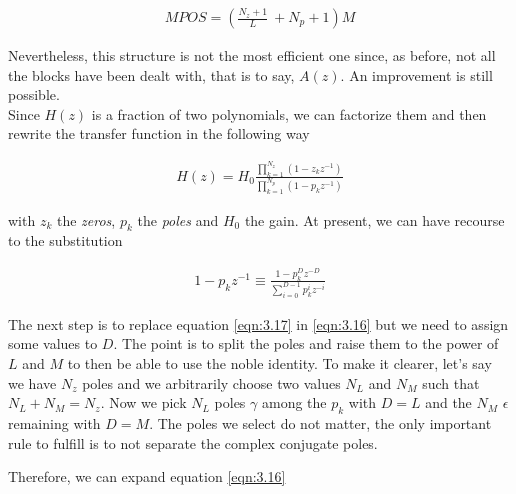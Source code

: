 %

\begin{align}
	MPOS = (\frac{N_z+1}{L}\ + N_p + 1)M\label{eqn:3.15}
\end{align}

Nevertheless, this structure is not the most efficient one since, as before, not all the blocks have been dealt with, that is to say, $A(z)$. An improvement is still possible.\\

Since $H(z)$ is a fraction of two polynomials, we can factorize them and then rewrite the transfer function in the following way

\begin{align}
	H(z) = H_0\frac{\prod\limits_{k=1}^{N_z} (1 - z_k z^{-1} )}{\prod\limits_{k=1}^{N_p} (1 - p_k z^{-1})}
	\label{eqn:3.16}
\end{align}

with $z_k$ the \textit{zeros}, $p_k$ the \textit{poles} and $H_0$ the gain. At present, we can have recourse to the substitution 

\begin{align}
	1 - p_kz^{-1} \equiv \frac{1 - p_k^Dz^{-D}}{\sum\limits_{i=0}^{D-1}p_k^iz^{-i}}
	\label{eqn:3.17}
\end{align} 


The next step is to replace equation \ref{eqn:3.17} in \ref{eqn:3.16} but we need to assign some values to $D$. The point is to split the poles and raise them to the power of $L$ and $M$ to then be able to use the noble identity. To make it clearer, let's say we have $N_z$ poles and we arbitrarily choose two values $N_L$ and $N_M$ such that $N_L + N_M = N_z$. Now we pick $N_L$ poles $\gamma$ among the $p_k$ with $D = L$ and the $N_M$ $\epsilon$ remaining with $D = M$. The poles we select do not matter, the only important rule to fulfill is to not separate the complex conjugate poles. 

Therefore, we can expand equation \ref{eqn:3.16}

